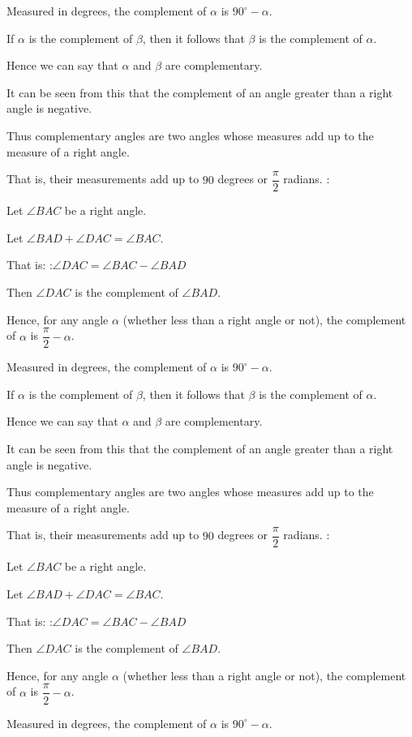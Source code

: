 Measured in degrees, the complement of $\alpha$ is $90^\circ - \alpha$.


If $\alpha$ is the complement of $\beta$, then it follows that $\beta$ is the complement of $\alpha$.

Hence we can say that $\alpha$ and $\beta$ are complementary.


It can be seen from this that the complement of an angle greater than a right angle is negative.


Thus complementary angles are two angles whose measures add up to the measure of a right angle.

That is, their measurements add up to $90$ degrees or $\dfrac \pi 2$ radians.
:

Let $\angle BAC$ be a right angle.

Let $\angle BAD + \angle DAC = \angle BAC$.

That is:
:$\angle DAC = \angle BAC - \angle BAD$


Then $\angle DAC$ is the complement of $\angle BAD$.


Hence, for any angle $\alpha$ (whether less than a right angle or not), the complement of $\alpha$ is $\dfrac \pi 2 - \alpha$.

Measured in degrees, the complement of $\alpha$ is $90^\circ - \alpha$.


If $\alpha$ is the complement of $\beta$, then it follows that $\beta$ is the complement of $\alpha$.

Hence we can say that $\alpha$ and $\beta$ are complementary.


It can be seen from this that the complement of an angle greater than a right angle is negative.


Thus complementary angles are two angles whose measures add up to the measure of a right angle.

That is, their measurements add up to $90$ degrees or $\dfrac \pi 2$ radians.
:

Let $\angle BAC$ be a right angle.

Let $\angle BAD + \angle DAC = \angle BAC$.

That is:
:$\angle DAC = \angle BAC - \angle BAD$


Then $\angle DAC$ is the complement of $\angle BAD$.


Hence, for any angle $\alpha$ (whether less than a right angle or not), the complement of $\alpha$ is $\dfrac \pi 2 - \alpha$.

Measured in degrees, the complement of $\alpha$ is $90^\circ - \alpha$.


